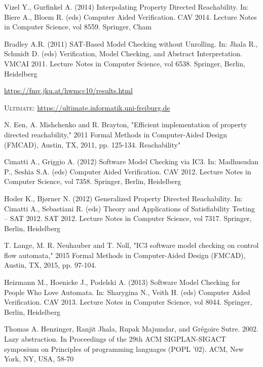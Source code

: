 \documentclass[11pt, a4paper, BCOR=10mm, ngerman, oneside]{scrbook}
\begin{document}
\pagebreak

\begin{thebibliography}{999}

 Vizel Y., Gurfinkel A. (2014) Interpolating Property Directed Reachability. In: Biere A., Bloem R. (eds) Computer Aided Verification. CAV 2014. Lecture Notes in Computer Science, vol 8559. Springer, Cham

 Bradley A.R. (2011) SAT-Based Model Checking without Unrolling. In: Jhala R., Schmidt D. (eds) Verification, Model Checking, and Abstract Interpretation. VMCAI 2011. Lecture Notes in Computer Science, vol 6538. Springer, Berlin, Heidelberg

 \url{https://fmv.jku.at/hwmcc10/results.html}

 \textsc{Ultimate}: \url{https://ultimate.informatik.uni-freiburg.de}

 N. Een, A. Mishchenko and R. Brayton, "Efficient implementation of property directed reachability," 2011 Formal Methods in Computer-Aided Design (FMCAD), Austin, TX, 2011, pp. 125-134.
Reachability"

 Cimatti A., Griggio A. (2012) Software Model Checking via IC3. In: Madhusudan P., Seshia S.A. (eds) Computer Aided Verification. CAV 2012. Lecture Notes in Computer Science, vol 7358. Springer, Berlin, Heidelberg

 Hoder K., Bjørner N. (2012) Generalized Property Directed Reachability. In: Cimatti A., Sebastiani R. (eds) Theory and Applications of Satisfiability Testing – SAT 2012. SAT 2012. Lecture Notes in Computer Science, vol 7317. Springer, Berlin, Heidelberg

 T. Lange, M. R. Neuhauber and T. Noll, "IC3 software model checking on control flow automata," 2015 Formal Methods in Computer-Aided Design (FMCAD), Austin, TX, 2015, pp. 97-104.

 Heizmann M., Hoenicke J., Podelski A. (2013) Software Model Checking for People Who Love Automata. In: Sharygina N., Veith H. (eds) Computer Aided Verification. CAV 2013. Lecture Notes in Computer Science, vol 8044. Springer, Berlin, Heidelberg

 Thomas A. Henzinger, Ranjit Jhala, Rupak Majumdar, and Grégoire Sutre. 2002. Lazy abstraction. In Proceedings of the 29th ACM SIGPLAN-SIGACT symposium on Principles of programming languages (POPL '02). ACM, New York, NY, USA, 58-70

\end{thebibliography}
\end{document}

